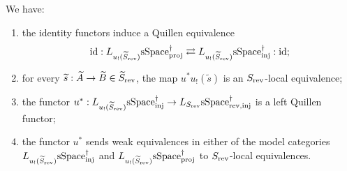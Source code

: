 \documentclass[a4paper,dvipdfmx,11pt]{amsart}
\begin{document}
\begin{lemma}\label{h1.thm.projection}
  We have:
  \begin{enumerate}
    \item the identity functors induce a Quillen equivalence 
    \begin{align}
      \operatorname{id} : L_{u_{!}(\widetilde S_{\mathrm{rev}})}\mathrm{sSpace}^{\dag}_{\mathrm{proj}} \rightleftarrows L_{u_{!}(\widetilde S_{\mathrm{rev}})}\mathrm{sSpace}^{\dag}_{\mathrm{inj}} : \operatorname{id};
    \end{align}
    \item for every $\widetilde s : \widetilde A\to\widetilde B\in\widetilde S_{\mathrm{rev}}$, the map $u^{*}u_{!}(\widetilde s)$ is an $S_{\mathrm{rev}}$-local equivalence;
    \item the functor $u^{*}:L_{u_{!}(\widetilde S_{\mathrm{rev}})}\mathrm{sSpace}^{\dag}_{\mathrm{inj}}\to L_{S_{\mathrm{rev}}}\mathrm{sSpace}^{\dag}_{\mathrm{rev},\mathrm{inj}}$ is a left Quillen functor;
    \item the functor $u^{*}$ sends weak equivalences in either of the model categories $L_{u_{!}(\widetilde S_{\mathrm{rev}})}\mathrm{sSpace}^{\dag}_{\mathrm{inj}}$ and $L_{u_{!}(\widetilde S_{\mathrm{rev}})}\mathrm{sSpace}^{\dag}_{\mathrm{proj}}$ to $S_{\mathrm{rev}}$-local equivalences.
  \end{enumerate}
\end{lemma}
\end{document}
